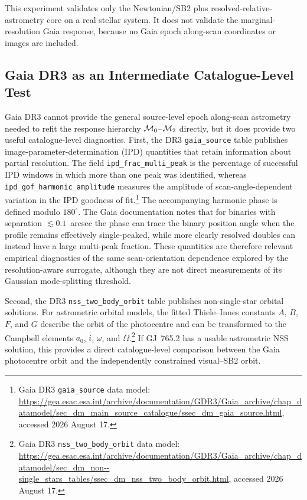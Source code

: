 This experiment validates only the Newtonian/SB2 plus resolved-relative-astrometry core on a real stellar system. It does not validate the marginal-resolution Gaia response, because no Gaia epoch along-scan coordinates or images are included.

\subsection{Gaia DR3 as an Intermediate Catalogue-Level Test}
\label{sect:dr3bridge}

Gaia DR3 cannot provide the general source-level epoch along-scan astrometry needed to refit the response hierarchy $\mathcal{M}_0$--$\mathcal{M}_2$ directly, but it does provide two useful catalogue-level diagnostics. First, the DR3 \texttt{gaia\_source} table publishes image-parameter-determination (IPD) quantities that retain information about partial resolution. The field \texttt{ipd\_frac\_multi\_peak} is the percentage of successful IPD windows in which more than one peak was identified, whereas \texttt{ipd\_gof\_harmonic\_amplitude} measures the amplitude of scan-angle-dependent variation in the IPD goodness of fit.\footnote{Gaia DR3 \texttt{gaia\_source} data model: \url{https://gea.esac.esa.int/archive/documentation/GDR3/Gaia_archive/chap_datamodel/sec_dm_main_source_catalogue/ssec_dm_gaia_source.html}, accessed 2026 August 17.} The accompanying harmonic phase is defined modulo $180^\circ$. The Gaia documentation notes that for binaries with separation $\lesssim0.1$~arcsec the phase can trace the binary position angle when the profile remains effectively single-peaked, while more clearly resolved doubles can instead have a large multi-peak fraction. These quantities are therefore relevant empirical diagnostics of the same scan-orientation dependence explored by the resolution-aware surrogate, although they are not direct measurements of its Gaussian mode-splitting threshold.

Second, the DR3 \texttt{nss\_two\_body\_orbit} table publishes non-single-star orbital solutions. For astrometric orbital models, the fitted Thiele--Innes constants $A$, $B$, $F$, and $G$ describe the orbit of the photocentre and can be transformed to the Campbell elements $a_0$, $i$, $\omega$, and $\Omega$.\footnote{Gaia DR3 \texttt{nss\_two\_body\_orbit} data model: \url{https://gea.esac.esa.int/archive/documentation/GDR3/Gaia_archive/chap_datamodel/sec_dm_non--single_stars_tables/ssec_dm_nss_two_body_orbit.html}, accessed 2026 August 17.} If GJ~765.2 has a usable astrometric NSS solution, this provides a direct catalogue-level comparison between the Gaia photocentre orbit and the independently constrained visual--SB2 orbit.

